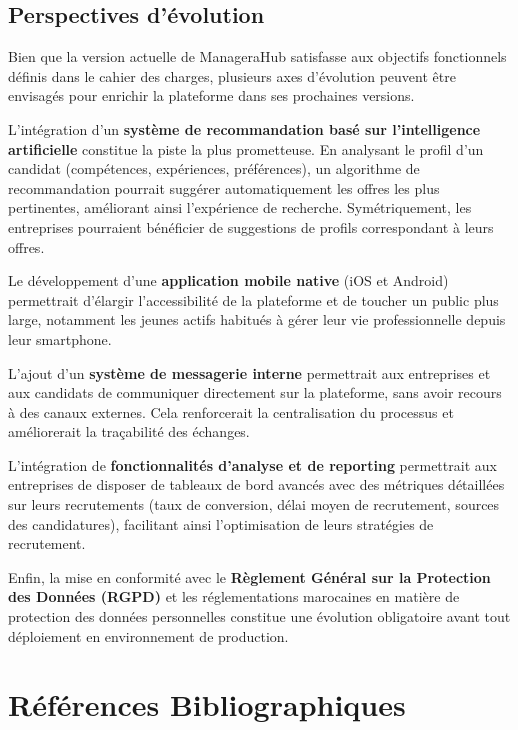 \documentclass[12pt,a4paper]{report}
\begin{document}
\section*{Perspectives d'évolution}

Bien que la version actuelle de ManageraHub satisfasse aux objectifs fonctionnels définis dans le cahier des charges, plusieurs axes d'évolution peuvent être envisagés pour enrichir la plateforme dans ses prochaines versions.

L'intégration d'un \textbf{système de recommandation basé sur l'intelligence artificielle} constitue la piste la plus prometteuse. En analysant le profil d'un candidat (compétences, expériences, préférences), un algorithme de recommandation pourrait suggérer automatiquement les offres les plus pertinentes, améliorant ainsi l'expérience de recherche. Symétriquement, les entreprises pourraient bénéficier de suggestions de profils correspondant à leurs offres.

Le développement d'une \textbf{application mobile native} (iOS et Android) permettrait d'élargir l'accessibilité de la plateforme et de toucher un public plus large, notamment les jeunes actifs habitués à gérer leur vie professionnelle depuis leur smartphone.

L'ajout d'un \textbf{système de messagerie interne} permettrait aux entreprises et aux candidats de communiquer directement sur la plateforme, sans avoir recours à des canaux externes. Cela renforcerait la centralisation du processus et améliorerait la traçabilité des échanges.

L'intégration de \textbf{fonctionnalités d'analyse et de reporting} permettrait aux entreprises de disposer de tableaux de bord avancés avec des métriques détaillées sur leurs recrutements (taux de conversion, délai moyen de recrutement, sources des candidatures), facilitant ainsi l'optimisation de leurs stratégies de recrutement.

Enfin, la mise en conformité avec le \textbf{Règlement Général sur la Protection des Données (RGPD)} et les réglementations marocaines en matière de protection des données personnelles constitue une évolution obligatoire avant tout déploiement en environnement de production.

\chapter*{Références Bibliographiques}
\end{document}
